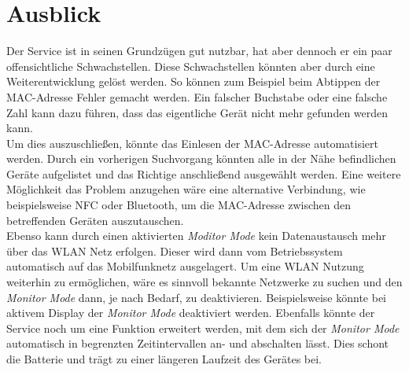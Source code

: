 \documentclass[]{report}
\begin{document}
\section{Ausblick}
Der Service ist in seinen Grundzügen gut nutzbar, hat aber dennoch er ein paar offensichtliche Schwachstellen. Diese Schwachstellen könnten aber durch eine Weiterentwicklung gelöst werden. So können zum Beispiel beim Abtippen der MAC-Adresse Fehler gemacht werden. Ein falscher Buchstabe oder eine falsche Zahl kann dazu führen, dass das eigentliche Gerät nicht mehr gefunden werden kann. \\
Um dies auszuschließen, könnte das Einlesen der MAC-Adresse automatisiert werden. Durch ein vorherigen Suchvorgang könnten alle in der Nähe befindlichen Geräte aufgelistet und das Richtige anschließend ausgewählt werden. Eine weitere Möglichkeit das Problem anzugehen wäre eine alternative Verbindung, wie beispielsweise NFC oder Bluetooth, um die MAC-Adresse zwischen den betreffenden Geräten auszutauschen.\\
Ebenso kann durch einen aktivierten \textit{Moditor Mode} kein Datenaustausch mehr über das WLAN Netz erfolgen. Dieser wird dann vom Betriebssystem automatisch auf das Mobilfunknetz ausgelagert. Um eine WLAN Nutzung weiterhin zu ermöglichen, wäre es sinnvoll bekannte Netzwerke zu suchen und den \textit{Monitor Mode} dann, je nach Bedarf, zu deaktivieren. Beispielsweise könnte bei aktivem Display der \textit{Monitor Mode} deaktiviert werden. 
Ebenfalls könnte der Service noch um eine Funktion erweitert werden, mit dem sich der \textit{Monitor Mode} automatisch in begrenzten Zeitintervallen an- und abschalten lässt. Dies schont die Batterie und trägt zu einer längeren Laufzeit des Gerätes bei. \\ 


\end{document}
